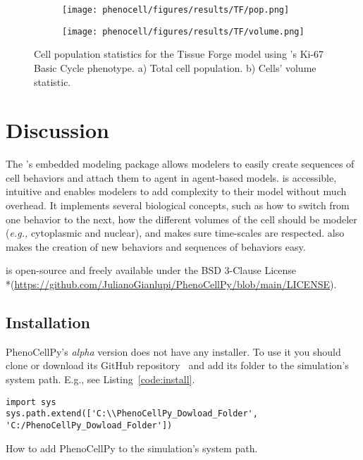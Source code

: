 \begin{figure}[!htbp]
    \centering
    \begin{subfigure}{.45\textwidth}
        \texttt{[image: phenocell/figures/results/TF/pop.png]}
        \caption{}\label{fig:res:tf:graph:pop}
    \end{subfigure}
    \begin{subfigure}{.45\textwidth}
        \texttt{[image: phenocell/figures/results/TF/volume.png]}
        \caption{}\label{fig:res:tf:graph:vol}
    \end{subfigure}
    \caption{Cell population statistics for the Tissue Forge model using \pcp's Ki-67 Basic Cycle phenotype. a) Total cell population. b) Cells' volume statistic.}
    \label{fig:res:tf:graph}
\end{figure}





\section{Discussion}

The \pcp's embedded modeling package allows modelers to easily create sequences of cell behaviors and attach them to agent in agent-based models. \pcps is accessible, intuitive and enables modelers to add complexity to their model without much overhead. It implements several biological concepts, such as how to switch from one behavior to the next, how the different volumes of the cell should be modeler (\textit{e.g.,} cytoplasmic and nuclear), and makes sure time-scales are respected. \pcps also makes the creation of new behaviors and sequences of behaviors easy.

\pcps is open-source and freely available under the BSD 3-Clause License \\*(\textcolor{blue}{\url{https://github.com/JulianoGianlupi/PhenoCellPy/blob/main/LICENSE}}).

\subsection{Installation}\label{sec:install}
PhenoCellPy's \textit{alpha} version does not have any installer. To use it you should clone or download its GitHub repository~\cite{gianlupi_phenocellpy_2022} and add its folder to the simulation's system path. E.g., see Listing~\ref{code:install}.


\begin{listing}[!htpb]
\begin{verbatim}
import sys
sys.path.extend(['C:\\PhenoCellPy_Dowload_Folder', 
'C:/PhenoCellPy_Dowload_Folder'])
\end{verbatim}
\caption{How to add PhenoCellPy to the simulation's system path.}\label{code:install}
\end{listing}

